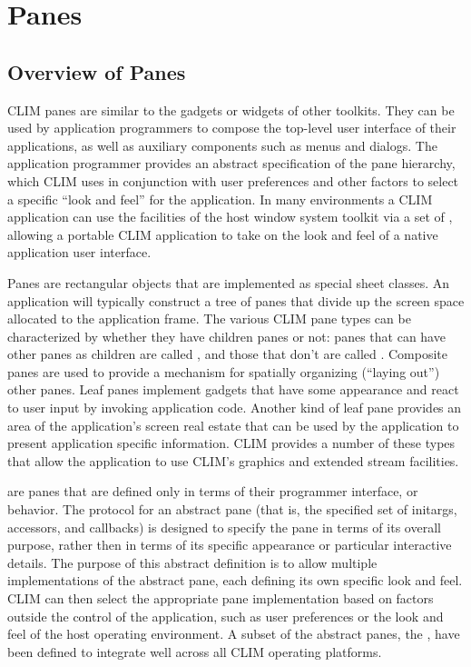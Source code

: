 
\chapter {Panes}
\label {panes}

\section {Overview of Panes}

CLIM panes are similar to the gadgets or widgets of other toolkits.  They can be
used by application programmers to compose the top-level user interface of their
applications, as well as auxiliary components such as menus and dialogs.  The
application programmer provides an abstract specification of the pane hierarchy,
which CLIM uses in conjunction with user preferences and other factors to select
a specific ``look and feel'' for the application.  In many environments a CLIM
application can use the facilities of the host window system toolkit via a set
of , allowing a portable CLIM application to take on the
look and feel of a native application user interface.

Panes are rectangular objects that are implemented as special sheet classes.  An
application will typically construct a tree of panes that divide up the screen
space allocated to the application frame.  The various CLIM pane types can be
characterized by whether they have children panes or not: panes that can have
other panes as children are called , and those that
don't are called .  Composite panes are used to provide a
mechanism for spatially organizing (``laying out'') other panes.  Leaf panes
implement gadgets that have some appearance and react to user input by invoking
application code.  Another kind of leaf pane provides an area of the
application's screen real estate that can be used by the application to present
application specific information.  CLIM provides a number of these
 types that allow the application to use CLIM's
graphics and extended stream facilities.

 are panes that are defined only in terms of their
programmer interface, or behavior.  The protocol for an abstract pane (that is,
the specified set of initargs, accessors, and callbacks) is designed to specify
the pane in terms of its overall purpose, rather then in terms of its specific
appearance or particular interactive details.  The purpose of this abstract
definition is to allow multiple implementations of the abstract pane, each
defining its own specific look and feel.  CLIM can then select the appropriate
pane implementation based on factors outside the control of the application,
such as user preferences or the look and feel of the host operating environment.
A subset of the abstract panes, the , have been defined to
integrate well across all CLIM operating platforms.


